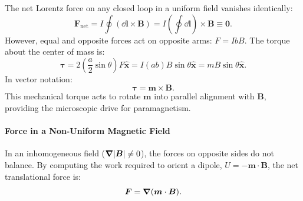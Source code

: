 The net Lorentz force on any closed loop in a uniform field vanishes identically:
\begin{equation}
    \bm{F}_{\text{net}} = I \oint (\dd{\bm{l}}\times \bm{B}) = I \left(\oint \dd{\bm{l}}\right) \times \bm{B} \equiv \bm{0}.
\end{equation}
However, equal and opposite forces act on opposite arms: $F = I b B$. The torque about the center of mass is:
\begin{equation}
    \bm{\tau} = 2 \left( \frac{a}{2} \sin\theta \right) F \hat{\bm{x}} = I (ab) B \sin\theta \hat{\bm{x}} = m B \sin\theta \hat{\bm{x}}.
\end{equation}
In vector notation:
\begin{equation}
    \bm{\tau} = \bm{m}\times \bm{B}.
    \label{eq:torque_dipole}
\end{equation}
This mechanical torque acts to rotate $\bm{m}$ into parallel alignment with $\bm{B}$, providing the microscopic drive for paramagnetism.

\paragraph{Force in a Non-Uniform Magnetic Field}

In an inhomogeneous field ($\grad |\bm{B}| \neq 0$), the forces on opposite sides do not balance. By computing the work required to orient a dipole, $U = -\bm{m}\cdot \bm{B}$, the net translational force is:
\begin{equation}
    \bm{F} = \grad(\bm{m}\cdot \bm{B}).
    \label{eq:force_dipole}
\end{equation}

